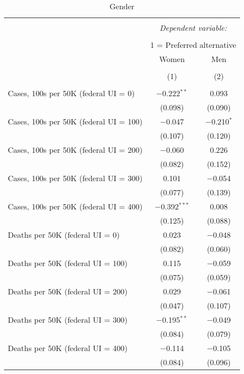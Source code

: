 
\begin{table}[!htbp] \centering \scriptsize 
  \caption{Gender} 
  \label{} 
\begin{tabular}{@{\extracolsep{5pt}}lcc} 
\\[-1.8ex]\hline 
\hline \\[-1.8ex] 
 & \multicolumn{2}{c}{\textit{Dependent variable:}} \\ 
\cline{2-3} 
\\[-1.8ex] & \multicolumn{2}{c}{1 = Preferred alternative} \\ 
 & Women & Men \\ 
\\[-1.8ex] & (1) & (2)\\ 
\hline \\[-1.8ex] 
 Cases, 100s per 50K (federal UI = 0) & $-$0.222$^{**}$ & 0.093 \\ 
  & (0.098) & (0.090) \\ 
  Cases, 100s per 50K (federal UI = 100) & $-$0.047 & $-$0.210$^{*}$ \\ 
  & (0.107) & (0.120) \\ 
  Cases, 100s per 50K (federal UI = 200) & $-$0.060 & 0.226 \\ 
  & (0.082) & (0.152) \\ 
  Cases, 100s per 50K (federal UI = 300) & 0.101 & $-$0.054 \\ 
  & (0.077) & (0.139) \\ 
  Cases, 100s per 50K (federal UI = 400) & $-$0.392$^{***}$ & 0.008 \\ 
  & (0.125) & (0.088) \\ 
  Deaths per 50K (federal UI = 0) & 0.023 & $-$0.048 \\ 
  & (0.082) & (0.060) \\ 
  Deaths per 50K (federal UI = 100) & 0.115 & $-$0.059 \\ 
  & (0.075) & (0.059) \\ 
  Deaths per 50K (federal UI = 200) & 0.029 & $-$0.061 \\ 
  & (0.047) & (0.107) \\ 
  Deaths per 50K (federal UI = 300) & $-$0.195$^{**}$ & $-$0.049 \\ 
  & (0.084) & (0.079) \\ 
  Deaths per 50K (federal UI = 400) & $-$0.114 & $-$0.105 \\ 
  & (0.084) & (0.096) \\ 

\end{tabular}
\end{table}
